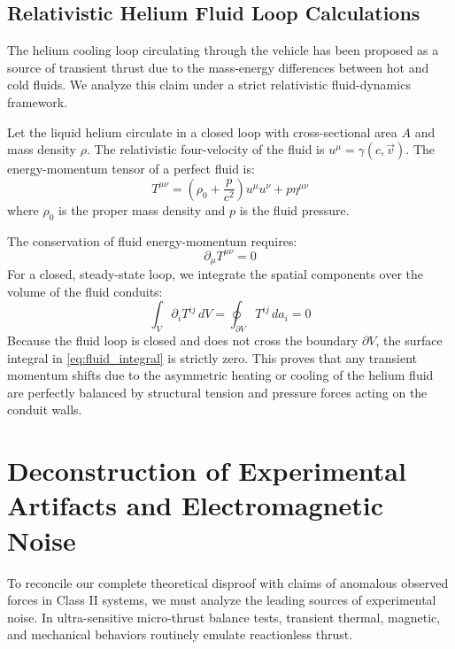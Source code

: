 \documentclass[journal,10pt,twoside]{IEEEtran}
\begin{document}
\subsection{Relativistic Helium Fluid Loop Calculations}
The helium cooling loop circulating through the vehicle has been proposed as a source of transient thrust due to the mass-energy differences between hot and cold fluids. We analyze this claim under a strict relativistic fluid-dynamics framework.

Let the liquid helium circulate in a closed loop with cross-sectional area $A$ and mass density $\rho$. The relativistic four-velocity of the fluid is $u^\mu = \gamma(c, \vec{v})$. The energy-momentum tensor of a perfect fluid is:
\begin{equation}
T^{\mu\nu} = \left(\rho_0 + \frac{p}{c^2}\right) u^\mu u^\nu + p \eta^{\mu\nu}
\label{eq:fluid_tensor}
\end{equation}
where $\rho_0$ is the proper mass density and $p$ is the fluid pressure.

The conservation of fluid energy-momentum requires:
\begin{equation}
\partial_\mu T^{\mu\nu} = 0
\label{eq:fluid_conservation}
\end{equation}
For a closed, steady-state loop, we integrate the spatial components over the volume of the fluid conduits:
\begin{equation}
\int_{V} \partial_i T^{ij} \, dV = \oint_{\partial V} T^{ij} \, da_i = 0
\label{eq:fluid_integral}
\end{equation}
Because the fluid loop is closed and does not cross the boundary $\partial V$, the surface integral in \eqref{eq:fluid_integral} is strictly zero. This proves that any transient momentum shifts due to the asymmetric heating or cooling of the helium fluid are perfectly balanced by structural tension and pressure forces acting on the conduit walls.

\section{Deconstruction of Experimental Artifacts and Electromagnetic Noise}
\label{sec:experimental_artifacts}

To reconcile our complete theoretical disproof with claims of anomalous observed forces in Class II systems, we must analyze the leading sources of experimental noise. In ultra-sensitive micro-thrust balance tests, transient thermal, magnetic, and mechanical behaviors routinely emulate reactionless thrust.
\end{document}
